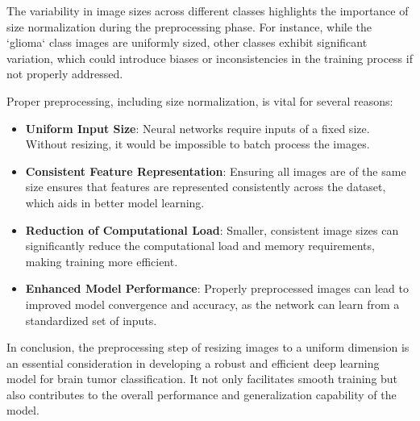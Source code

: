 The variability in image sizes across different classes highlights the importance of size normalization during the preprocessing phase. For instance, while the `glioma` class images are uniformly sized, other classes exhibit significant variation, which could introduce biases or inconsistencies in the training process if not properly addressed.

Proper preprocessing, including size normalization, is vital for several reasons:
\begin{itemize}
    \item \textbf{Uniform Input Size}: Neural networks require inputs of a fixed size. Without resizing, it would be impossible to batch process the images.
    \item \textbf{Consistent Feature Representation}: Ensuring all images are of the same size ensures that features are represented consistently across the dataset, which aids in better model learning.
    \item \textbf{Reduction of Computational Load}: Smaller, consistent image sizes can significantly reduce the computational load and memory requirements, making training more efficient.
    \item \textbf{Enhanced Model Performance}: Properly preprocessed images can lead to improved model convergence and accuracy, as the network can learn from a standardized set of inputs.
\end{itemize}

In conclusion, the preprocessing step of resizing images to a uniform dimension is an essential consideration in developing a robust and efficient deep learning model for brain tumor classification. It not only facilitates smooth training but also contributes to the overall performance and generalization capability of the model.

